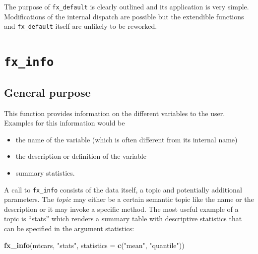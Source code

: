 \documentclass[]{report}
\newenvironment{Shaded}{\begin{snugshade}}{\end{snugshade}}
\newcommand{\KeywordTok}[1]{\textcolor[rgb]{0.13,0.29,0.53}{\textbf{#1}}}
\newcommand{\DataTypeTok}[1]{\textcolor[rgb]{0.13,0.29,0.53}{#1}}
\newcommand{\StringTok}[1]{\textcolor[rgb]{0.31,0.60,0.02}{#1}}
\newcommand{\NormalTok}[1]{#1}
\providecommand{\tightlist}{%
  \setlength{\itemsep}{0pt}\setlength{\parskip}{0pt}}
\theoremstyle{definition}
\theoremstyle{definition}
\theoremstyle{definition}
\theoremstyle{remark}
\begin{document}
The purpose of \texttt{fx\_default} is clearly outlined and its
application is very simple. Modifications of the internal dispatch are
possible but the extendible functions and \texttt{fx\_default} itself
are unlikely to be reworked.

\section{\texorpdfstring{\texttt{fx\_info}}{fx\_info}}\label{fx_info}

\subsection{General purpose}\label{general-purpose-1}

This function provides information on the different variables to the
user. Examples for this information would be

\begin{itemize}
\tightlist
\item
  the name of the variable (which is often different from its internal
  name)
\item
  the description or definition of the variable
\item
  summary statistics.
\end{itemize}

A call to \texttt{fx\_info} consists of the data itself, a topic and
potentially additional parameters. The \emph{topic} may either be a
certain semantic topic like the name or the description or it may invoke
a specific method. The most useful example of a topic is ``stats'' which
renders a summary table with descriptive statistics that can be
specified in the argument statistics:

\begin{Shaded}
\begin{Highlighting}[]
\KeywordTok{fx_info}\NormalTok{(mtcars, }\StringTok{"stats"}\NormalTok{, }\DataTypeTok{statistics =} \KeywordTok{c}\NormalTok{(}\StringTok{"mean"}\NormalTok{, }\StringTok{"quantile"}\NormalTok{))}
\end{Highlighting}
\end{Shaded}
\end{document}
